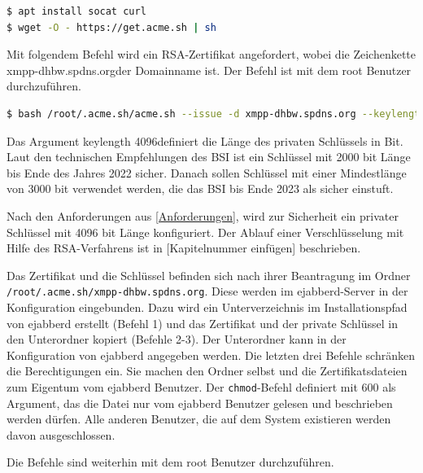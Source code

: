 \documentclass[a4paper,titlepage,halfparskip,12pt]{scrreprt}
\begin{document}
\begin{onehalfspacing}
\begin{lstlisting}[language=bash, caption={Installation der ACME-Client-Software für die Domainvalidierung}]
$ apt install socat curl
$ wget -O - https://get.acme.sh | sh
\end{lstlisting}

Mit folgendem Befehl wird ein \ac{RSA}-Zertifikat angefordert, wobei die Zeichenkette \glqq xmpp-dhbw.spdns.org\grqq der Domainname ist. Der Befehl ist mit dem root Benutzer durchzuführen.

\bigskip

\begin{lstlisting}[language=bash, caption={Installation des Let's Encrpt Zertifikats durch den ACME-Client}]
$ bash /root/.acme.sh/acme.sh --issue -d xmpp-dhbw.spdns.org --keylength 4096 --standalone
\end{lstlisting}

Das Argument \glqq keylength 4096\grqq definiert die Länge des privaten Schlüssels in Bit. Laut den technischen Empfehlungen des \ac{BSI} ist ein Schlüssel mit 2000 bit Länge bis Ende des Jahres 2022 sicher. Danach sollen Schlüssel mit einer Mindestlänge von 3000 bit verwendet werden, die das \ac{BSI} bis Ende 2023 als sicher einstuft.\cite{empfehlungBSI}

Nach den Anforderungen aus \autoref{Anforderungen}, wird zur Sicherheit ein privater Schlüssel mit 4096 bit Länge konfiguriert. Der Ablauf einer Verschlüsselung mit Hilfe des \ac{RSA}-Verfahrens ist in [Kapitelnummer einfügen] beschrieben.

Das Zertifikat und die Schlüssel befinden sich nach ihrer Beantragung im Ordner \texttt{/root/.acme.sh/xmpp-dhbw.spdns.org}. Diese werden im ejabberd-Server in der Konfiguration eingebunden. Dazu wird ein Unterverzeichnis im Installationspfad von ejabberd erstellt (Befehl 1) und das Zertifikat und der private Schlüssel in den Unterordner kopiert (Befehle 2-3). Der Unterordner kann in der Konfiguration von ejabberd angegeben werden.
Die letzten drei Befehle schränken die Berechtigungen ein. Sie machen den Ordner selbst und die Zertifikatsdateien zum Eigentum vom ejabberd Benutzer. Der \texttt{chmod}-Befehl definiert mit 600 als Argument, das die Datei nur vom ejabberd Benutzer gelesen und beschrieben werden dürfen. Alle anderen Benutzer, die auf dem System existieren werden davon ausgeschlossen.

Die Befehle sind weiterhin mit dem root Benutzer durchzuführen.

\bigskip


\end{onehalfspacing}
\end{document}
